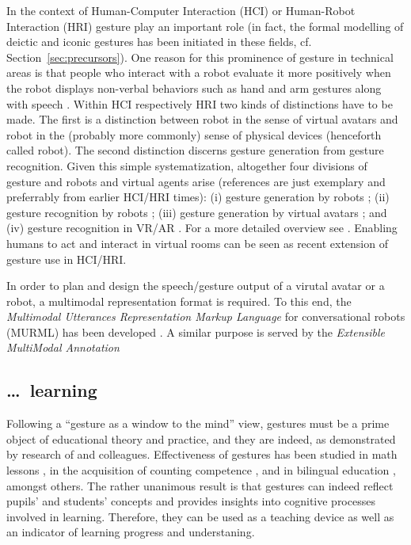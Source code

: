 \documentclass[output=paper]{langsci/langscibook}
\begin{document}
In the context of Human-Computer Interaction (HCI) or Human-Robot Interaction (HRI) gesture play an important role (in fact, the formal modelling of deictic and iconic gestures has been initiated in these fields, cf. Section~\ref{sec:precursors}).
%
One reason for this prominence of gesture in technical areas is that people who interact with a robot evaluate it more positively when the robot displays non-verbal behaviors such as hand and arm gestures along with speech \citep[see e.g.]{Salem:et:al:2012}.
%
Within HCI respectively HRI two kinds of distinctions have to be made. 
%
The first is a distinction between robot in the sense of virtual avatars and robot in the (probably more commonly) sense of physical devices (henceforth called robot).
%
The second distinction discerns gesture generation from gesture recognition.
%
Given this simple systematization, altogether four divisions of gesture and robots and virtual agents arise (references are just exemplary and preferrably from earlier HCI/HRI times):
%
(i) gesture generation by robots \citep[e.g.][]{Le:et:al:2011};
%
(ii) gesture recognition by robots \citep[e.g.][]{Triesch:vanDerMalsburg:1998};
%
(iii) gesture generation by virtual avatars \citep[e.g.][]{Cassell:Stone:Yan:2000};
%
and (iv) gesture recognition in VR/AR \citep[e.g.][]{Weissmann:Salomon:1999}.
%
For a more detailed overview see \citet{Luecking:Pfeiffer:2012}.
%
Enabling humans to act and interact in virtual rooms \citep[e.g.][]{Pfeiffer:et:al:2018} can be seen as recent extension of gesture use in HCI/HRI.


In order to plan and design the speech/gesture output of a virutal avatar or a robot, a multimodal representation format is required.
%
To this end, the \textit{Multimodal Utterances Representation Markup Language} for conversational robots (MURML) has been developed \citep{Kranstedt:Kopp:Wachsmuth:2002:b}.
%
A similar purpose is served by the \textit{Extensible MultiModal Annotation} \citep[EMMA;][]{Johnston:2009}





\subsection{\ldots\ learning}
\label{sec:learning}

Following a \enquote{gesture as a window to the mind} view, gestures must be a prime object of educational theory and practice, and they are indeed, as demonstrated by research of \citet{Cook:Goldin-Meadow:2006} and colleagues.
%
Effectiveness of gestures has been studied in math lessons \citep{Goldin-Meadow:Nusbaum:Kelly:Wagner:2001}, in the acquisition of counting competence \citep{Alibali:DiRusso:1999}, and in bilingual education \citep{Breckinridge-Church:Ayman-Nolley:Mahootian:2004}, amongst others.
%
The rather unanimous result is that gestures can indeed reflect pupils' and students' concepts and provides insights into cognitive processes involved in learning.
%
Therefore, they can be used as a teaching device as well as an indicator of learning progress and understaning. 
\end{document}
